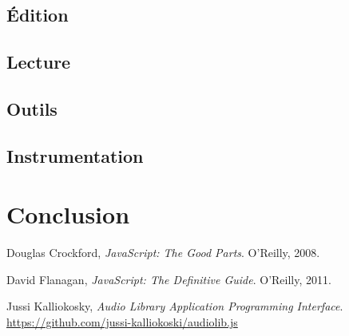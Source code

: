 \documentclass[pdftex,12pt,a4paper]{article}
\begin{document}
\subsection{Édition}

\subsection{Lecture}

\subsection{Outils}

\subsection{Instrumentation}


\section{Conclusion}

\pagebreak

\begin{thebibliography}{99}

	Douglas Crockford,
	\emph{JavaScript: The Good Parts}.
	O'Reilly, 2008.

\medskip

	David Flanagan,
	\emph{JavaScript: The Definitive Guide}.
	O'Reilly, 2011.

\medskip

	Jussi Kalliokosky,
	\emph{Audio Library Application Programming Interface}.\\
	\url{https://github.com/jussi-kalliokoski/audiolib.js}

\end{thebibliography}

\appendix
\end{document}
